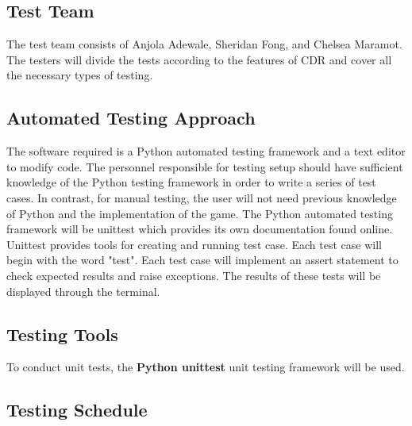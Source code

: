 \documentclass[12pt, titlepage]{article}
\begin{document}
	\subsection{Test Team}
	The test team consists of Anjola Adewale, Sheridan Fong, and Chelsea Maramot. The testers will divide the tests according to the features of CDR and cover all the necessary types of testing.
	
	
	\subsection{Automated Testing Approach}
	
	The software required is a Python automated testing framework and a text editor to modify code. The personnel responsible for testing setup should have sufficient knowledge of the Python testing framework in order to write a series of test cases. In contrast, for manual testing, the user will not need previous knowledge of Python and the implementation of the game. The Python automated testing framework will be unittest which provides its own documentation found online. Unittest provides tools for creating and running test case. Each test case will begin with the word "test". Each test case will implement an assert statement to check expected results and raise exceptions. The results of these tests will be displayed through the terminal. 
	\subsection{Testing Tools}
	
	To conduct unit tests, the \textbf{Python unittest} unit testing framework will be used.
	
	
	\subsection{Testing Schedule}
	
\end{document}
